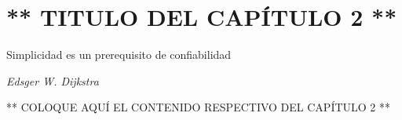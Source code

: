\chapter{** TITULO DEL CAPÍTULO 2 **}
\thispagestyle{empty}

\epigraph{\flushright Simplicidad es un prerequisito de confiabilidad}{\textit{Edsger W. Dijkstra}}

** COLOQUE AQUÍ EL CONTENIDO RESPECTIVO DEL CAPÍTULO 2 **